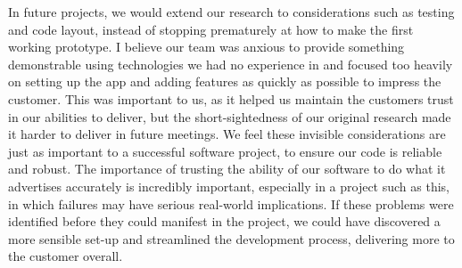 \documentclass{l3proj}
\begin{document}
In future projects, we would extend our research to considerations such as testing and code layout, instead of stopping prematurely at how to make the first working prototype. I believe our team was anxious to provide something demonstrable using technologies we had no experience in and focused too heavily on setting up the app and adding features as quickly as possible to impress the customer. This was important to us, as it helped us maintain the customers trust in our abilities to deliver, but the short-sightedness of our original research made it harder to deliver in future meetings. We feel these invisible considerations are just as important to a successful software project, to ensure our code is reliable and robust. The importance of trusting the ability of our software to do what it advertises accurately is incredibly important, especially in a project such as this, in which failures may have serious real-world implications. If these problems were identified before they could manifest in the project, we could have discovered a more sensible set-up and streamlined the development process, delivering more to the customer overall.

\label{sec:Research}
\end{document}
